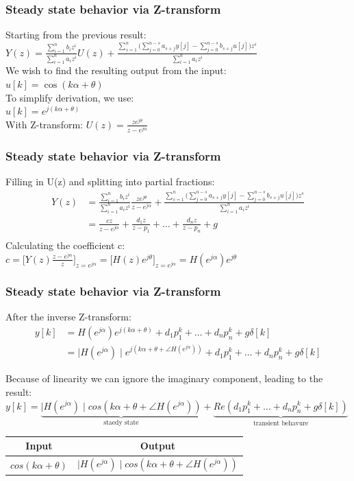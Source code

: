 \begin{frame}
	\frametitle{Steady state behavior via Z-transform}
	Starting from the previous result:\\
	$Y(z) = \frac{\sum\limits_{i=1}^{n} b_i z^i}{\sum\limits_{i=1}^{n} a_i z^i} U(z) + \frac{\sum\limits_{s=1}^{n}\Bigg(\sum\limits_{j=0}^{n-s}a_{s+j}y[j]-\sum\limits_{j=0}^{n-s}b_{s+j}u[j]\Bigg)z^{s}}{\sum\limits_{i=1}^{n}a_i z^i}$\\
	We wish to find the resulting output from the input:\\
	$ u[k] = \cos(k\alpha + \theta)$\\
	To simplify derivation, we use:\\
	$u[k] = e^{j(k\alpha + \theta)}$\\
	With Z-transform:	$U(z) = \frac{ze^{j\theta}}{z-e^{j\alpha}}$
	
\end{frame}
\begin{frame}
	\frametitle{Steady state behavior via Z-transform}
	Filling in U(z) and splitting into partial fractions:
	\begin{align*}
			Y(z) &= \frac{\sum\limits_{i=1}^{n} b_i z^i}{\sum\limits_{i=1}^{n} a_i z^i} \frac{ze^{j\theta}}{z-e^{j\alpha}} + \frac{\sum\limits_{s=1}^{n}\Bigg(\sum\limits_{j=0}^{n-s}a_{s+j}y[j]-\sum\limits_{j=0}^{n-s}b_{s+j}u[j]\Bigg)	z^{s}}{\sum\limits_{i=1}^{n} a_i z^{i}}\\
			& = \frac{cz}{z-e^{j\alpha}} + \frac{d_1z}{z-p_1} + \dots + \frac{d_nz}{z-p_n}+g\\
	\end{align*}
	Calculating the coefficient c:\\
	$c= \bigg[Y(z)\frac{z-e^{j\alpha}}{z}\bigg]_{z=e^{j\alpha}} = \bigg[H(z)e^{j\theta}\bigg]_{z=e^{j\alpha}} = H(e^{j\alpha})e^{j\theta}$\\

\end{frame}
\begin{frame}
	\frametitle{Steady state behavior via Z-transform}
	\small{
		After the inverse Z-transform:
		\begin{align*}			y[k]&=H(e^{j\alpha})e^{j(k\alpha+\theta)}+d_1p_1^k+\dots+d_np_n^{k}+g\delta[k]\\
		 &= \mid H(e^{j\alpha}) \mid e^{j(k\alpha+\theta+\angle H(e^{j\alpha}))} +d_1p_1^k+\dots+d_np_n^{k}+g\delta[k]
		\end{align*}
		
	Because of linearity we can ignore the imaginary component, leading to the result:\\
	$y[k] =  \underbrace{\mid H(e^{j\alpha}) \mid cos(k\alpha+\theta+\angle H(e^{j\alpha}))}_{\text{staedy state}} + \underbrace{Re(d_1p_1^k+\dots+d_np_n^{k}+g\delta[k])}_{\text{transient behavure}}$\\
	\begin{tabular}{|c|c|}
		\hline Input & Output \\ 
		\hline $cos(k\alpha + \theta)$ &  $\mid H(e^{j\alpha}) \mid cos(k\alpha+\theta+\angle H(e^{j\alpha}))$ \\ 
		\hline 
	\end{tabular} }
\end{frame}

